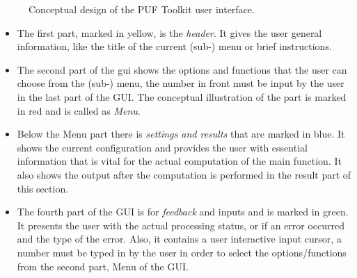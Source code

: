 \begin{figure}
\centering
{}
\caption{Conceptual design of the PUF Toolkit user interface.}
\label{img:gui_design}
\end{figure}

\begin{itemize}
	\item The first part, marked in yellow, is the \emph{header}. It gives the user general information, like the title of the current (sub-) menu or brief instructions.
	\item The second part of the gui shows the options and functions that the user can choose from the (sub-) menu, the number in front must be input by the user in the last part of the GUI. The conceptual illustration of the part is marked in red and is called as \emph{Menu}.
	\item Below the Menu part there is \emph{settings and results} that are marked in blue. It shows the current configuration and provides the user with essential information that is vital for the actual computation of the main function. It also shows the output after the computation is performed in the result part of this section.
	\item The fourth part of the GUI is for \emph{feedback} and inputs and is marked in green. It presents the user with the actual processing status, or if an error occurred and the type of the error. Also, it contains a user interactive input cursor, a number must be typed in by the user in order to select the options/functions from the second part, Menu of the GUI.
\end{itemize}



